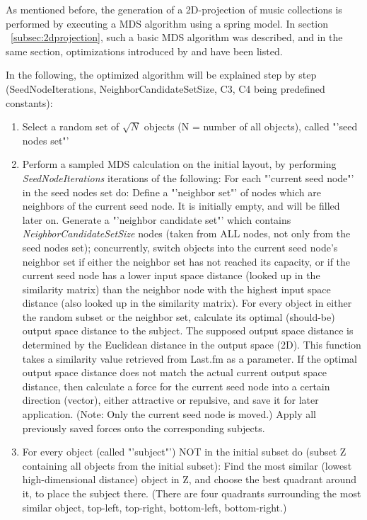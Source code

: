 As mentioned before, the generation of a 2D-projection of music collections is performed by executing a MDS algorithm using a spring model. In section ~\ref{subsec:2dprojection}, such a basic MDS algorithm was described, and in the same section, optimizations introduced by \cite{Chalmers:1996:LIT:244979.245035} and \cite{Morrison:2003:FMS} have been listed.

In the following, the optimized algorithm will be explained step by step (SeedNodeIterations, NeighborCandidateSetSize, C3, C4 being predefined constants):

\begin{enumerate}
	\item Select a random set of $\sqrt{N}$ objects (N = number of all objects), called "'seed nodes set"'
	\item Perform a sampled MDS calculation on the initial layout, by performing \emph{SeedNodeIterations} iterations of the following:
		\subitem For each "'current seed node"' in the seed nodes set do:
			\subsubitem Define a "'neighbor set"' of nodes which are neighbors of the current seed node. It is initially empty, and will be filled later on.
			\subsubitem Generate a "'neighbor candidate set"' which contains \emph{NeighborCandidateSetSize} nodes (taken from ALL nodes, not only from the seed nodes set); concurrently, switch objects into the current seed node's neighbor set if either the neighbor set has not reached its capacity, or if the current seed node has a lower input space distance (looked up in the similarity matrix) than the neighbor node with the highest input space distance (also looked up in the similarity matrix).
			\subsubitem For every object in either the random subset or the neighbor set, calculate its optimal (should-be) output space distance to the subject. The supposed output space distance is determined by the Euclidean distance in the output space (2D). This function takes a similarity value retrieved from Last.fm as a parameter.
			\subsubitem If the optimal output space distance does not match the actual current output space distance, then calculate a force for the current seed node into a certain direction (vector), either attractive or repulsive, and save it for later application. (Note: Only the current seed node is moved.)
		\subitem Apply all previously saved forces onto the corresponding subjects.
	\item For every object (called "'subject"') NOT in the initial subset do (subset Z containing all objects from the initial subset):
		\subitem Find the most similar (lowest high-dimensional distance) object in Z, and choose the best quadrant around it, to place the subject there. (There are four quadrants surrounding the most similar object, top-left, top-right, bottom-left, bottom-right.)

\end{enumerate}
